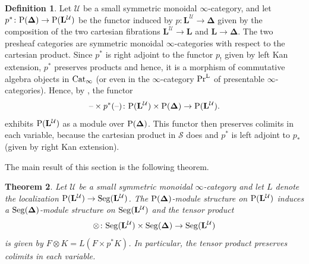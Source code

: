 \documentclass{amsart}
\newtheorem{theorem}{Theorem}
\numberwithin{theorem}{subsection}
\theoremstyle{definition}
\newtheorem{defn}[theorem]{Definition}
\newcommand{\xS}{\mathcal{S}}
\newcommand{\xU}{\mathcal{U}}
\newcommand{\Pre}{\name{P}}
\newcommand{\icat}{$\infty$-category}
\newcommand{\name}[1]{\ensuremath{\text{\textup{#1}}}}
\newcommand{\simp}{\mathbf{\Delta}}
\newcommand{\levelg}{\mathbf{L}}
\newcommand{\levelU}{\levelg^\xU}
\newcommand{\Seg}{\name{Seg}}
\newcommand{\blank}{\text{\textendash}}
\newcommand{\PrL}{\name{Pr}^{\mathrm{L}}}
\newcommand{\Cat}{\name{Cat}}
\newcommand{\CatI}{\Cat_{\infty}}
\begin{document}
\begin{defn}\label{def tensor}
	Let $\xU$ be a small symmetric monoidal \icat{}, and let $p^{*}\colon \Pre(\simp) \to \Pre(\levelU)$ be the functor induced by $p \colon \levelU \to \simp$ given by the composition of the two cartesian fibrations $\levelU \to \levelg$ and $\levelg \to
	\simp$.
	The two presheaf categories are symmetric monoidal $\infty$-categories with respect to the cartesian product. Since $p^*$ is right adjoint to the functor $p_!$ given by left Kan extension, $p^*$ preserves products and hence, it is a morphism of commutative algebra objects in $\CatI$ (or even in the $\infty$-category $\PrL$ of presentable $\infty$-categories).
	Hence, by \cite[Corollary 3.4.1.7]{ha}, the functor 
\[\blank \times p^{*}(\blank)\colon \Pre(\levelU) \times \Pre(\simp) \to \Pre(\levelU).\]
exhibits $\Pre(\levelU)$ as a module over $\Pre(\simp)$.
	This functor then preserves colimits in each variable, because the cartesian product in $\xS$ does and $p^{*}$ is left adjoint to $p_*$ (given by right Kan extension).
\end{defn}

The main result of this section is the following theorem.
\begin{theorem}\label{theo tensor}
Let $\xU$ be a small symmetric monoidal \icat{} and let $L$ denote the localization $\Pre(\levelU) \to \Seg(\levelU)$.
The $\Pre(\simp)$-module structure on $\Pre(\levelU)$ induces a $\Seg(\simp)$-module structure on $\Seg(\levelU)$ and the tensor product
	\[\otimes \colon \Seg(\levelU) \times \Seg(\simp) \to \Seg(\levelU)\] 
	is given by $F \otimes K = L(F \times p^{*}K)$.
	In particular, the tensor product preserves colimits in each variable.
\end{theorem}
\end{document}
